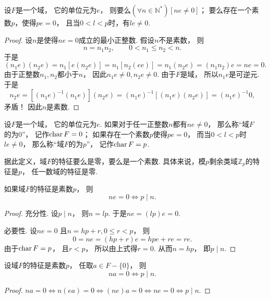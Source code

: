\begin{theorem}
设\(F\)是一个域，
它的单位元为\(e\)，
则要么\((\forall n\in\mathbb{N}^*)[ne\neq0]\)；
要么存在一个素数\(p\)，使得\(pe=0\)，
且当\(0<l<p\)时，有\(le\neq0\).
\begin{proof}
设\(n\)是使得\(ne=0\)成立的最小正整数.
假设\(n\)不是素数，
则\[
	n=n_1 n_2,
	\qquad
	0<n_1 \leq n_2<n.
\]
于是%
\[
	(n_1 e)(n_2 e)
	=n_1[e(n_2 e)]
	=n_1[n_2(ee)]
	=n_1(n_2 e)
	=(n_1 n_2)e
	=ne=0.
\]
由于正整数\(n_1,n_2\)都小于\(n\)，
因此\(n_1 e\neq0,
n_2 e\neq0\).
由于\(F\)是域，
所以\(n_1 e\)是可逆元.
于是\[
	n_2 e
	=[(n_1 e)^{-1} (n_1 e)](n_2 e)
	=(n_1 e)^{-1}
	[(n_1 e)(n_2 e)]
	=(n_1 e)^{-1} 0,
\]
矛盾！
因此\(n\)是素数.
\end{proof}
\end{theorem}

\begin{definition}
设\(F\)是一个域，
它的单位元为\(e\).
如果对于任一正整数\(n\)都有\(ne\neq0\)，
那么称“域\(F\)的为0”，
记作\(\operatorname{char} F=0\)；
如果存在一个素数\(p\)使得\(pe=0\)，
而当\(0<l<p\)时\(le\neq0\)，
那么称“域\(F\)的为\(p\)”，
记作\(\operatorname{char} F=p\).
\end{definition}

据此定义，域\(F\)的特征要么是零，要么是一个素数.
具体来说，模\(p\)剩余类域\(\mathbb{Z}_p\)的特征是\(p\)，
任一数域的特征是零.

\begin{corollary}
如果域\(F\)的特征是素数\(p\)，
则\[
	ne=0
	\iff
	p \mid n.
\]
\begin{proof}
充分性.
设\(p \mid n\)，
则\(n=lp\).
于是\(ne
=(lp)e
=0\).

必要性.
设\(ne=0\)
且\(n=hp+r,0\leq r<p\)，
则\[
	0=ne
	=(hp+r)e
	=hpe+re
	=re.
\]
由于\(\operatorname{char} F=p\)，
且\(r<p\)，
所以由上式得\(r=0\).
从而\(n=hp\)，
即\(p \mid n\).
\end{proof}
\end{corollary}

\begin{corollary}
设域\(F\)的特征是素数\(p\)，
任取\(a \in F-\{0\}\)，
则\[
	na=0
	\iff
	p \mid n.
\]
\begin{proof}
\(na=0
\iff
n(ea)=0
\iff
(ne)a=0
\iff
ne=0
\iff
p \mid n\).
\end{proof}
\end{corollary}

